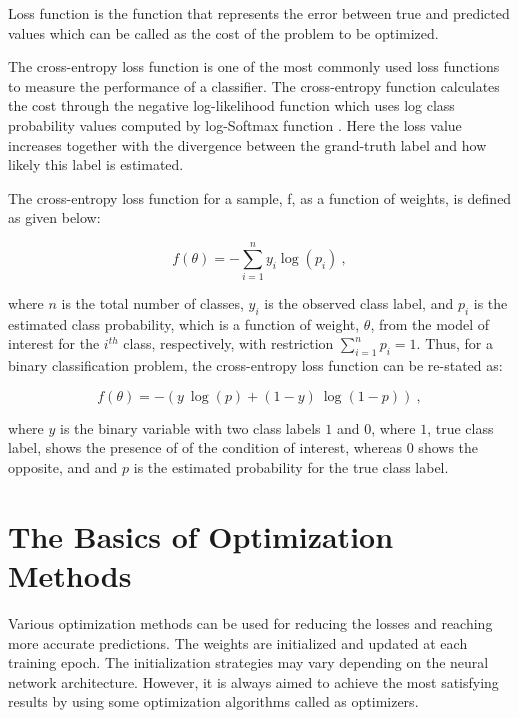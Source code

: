 Loss function is the function that represents the error between true and predicted values which can be called as the cost of the problem to be optimized.

The cross-entropy loss function is one of the most commonly used loss functions to measure the performance of a classifier. The cross-entropy function calculates the cost through the negative log-likelihood function \cite{negative-ll} which uses log class probability values computed by log-Softmax function \cite{logsoftmax}. Here the loss value increases together with the divergence between the grand-truth label and how likely this label is estimated.

The cross-entropy loss function for a sample, f, as a function of weights, is defined as given below:

\begin{equation}
	\label{eq:cross_entropy_loss_formulae}
	f(\theta) = - \sum_{i=1}^{n} y_{i} \log(p_{i}) \:,
\end{equation}

where $n$ is the total number of classes, $y_{i}$ is the observed class label, and $p_{i}$ is the estimated class probability, which is a function of weight, $\theta$, from the model of interest for the $i^{th}$ class, respectively, with restriction $\sum_{i=1}^{n}p_{i}=1$. Thus, for a binary classification problem, the cross-entropy loss function can be re-stated as:

\begin{equation}
	\label{eq:binary_cross_entropy_loss_formulae}
	f(\theta) = - \left ( y\:\log(p) + (1 - y)\:\log(1-p) \right ) \:,
\end{equation}

where $y$ is the binary variable with two class labels $1$ and $0$, where $1$, true class label, shows the presence of of the condition of interest, whereas $0$ shows the opposite, and and $p$ is the estimated probability for the true class label.

\section{The Basics of Optimization Methods}
\label{sec:CH3_the_basics_of_optimization}

Various optimization methods can be used for reducing the losses and reaching more accurate predictions. The weights are initialized and updated at each training epoch. The initialization strategies may vary depending on the neural network architecture. However, it is always aimed to achieve the most satisfying results by using some optimization algorithms called as optimizers.

